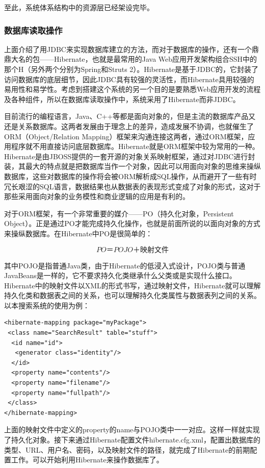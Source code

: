 \documentclass[12pt,a4paper]{article}
\begin{document}
	至此，系统体系结构中的资源层已经架设完毕。

		\subsubsection{数据库读取操作}
	上面介绍了用JDBC来实现数据库建立的方法，而对于数据库的操作，还有一个鼎鼎大名的包——Hibernate，也就是最常用的Java Web应用开发架构组合SSH中的那个H（另外两个分别为Spring和Struts 2）。Hibernate是基于JDBC的，它封装了访问数据库的底层细节，因此JDBC具有较强的灵活性，而Hibernate具用较强的易用性和易学性。考虑到搭建这个系统的另一个目的是要熟悉Web应用开发的流程及各种组件，所以在数据库读取操作中，系统采用了Hibernate而非JDBC。
	
	目前流行的编程语言，Java、C++等都是面向对象的，但是主流的数据库产品又还是关系数据库\cite{li2008}。这两者发展由于理念上的差异，造成发展不协调，也就催生了ORM（Object/Relation Mapping）框架来沟通连接这两者，通过ORM框架，应用程序就不用直接访问底层数据库。Hibernate就是ORM框架中较为常用的一种。Hibernate是由JBOSS提供的一套开源的对象关系映射框架，通过对JDBC进行封装，其最大的特点就是把数据库当作一个对象，因此可以用面向对象的思维来操纵数据库，这些对数据库的操作将会被ORM解析成SQL操作，从而避开了一些有时冗长艰涩的SQL语言，数据结果也从数据表的表现形式变成了对象的形式，这对于那些采用面向对象的业务模性和商业逻辑的应用是有利的。
	
	对于ORM框架，有一个非常重要的媒介——PO（持久化对象，Persistent Object）。正是通过PO才能完成持久化操作，也就是前面所说的以面向对象的方式来操纵数据库。在Hibernate中PO是很简单的：

	$$ PO ＝ POJO ＋ 映射文件 $$

	其中POJO是指普通Java类，由于Hibernate的低浸入式设计，POJO类与普通JavaBeans是一样的，它不要求持久化类继承什么父类或是实现什么接口。Hibernate中的映射文件以XML的形式书写，通过映射文件，Hibernate就可以理解持久化类和数据表之间的关系，也可以理解持久化类属性与数据表列之间的关系。以本搜索系统的使用为例：
	
\lstset{language=XML,frame=lines}
\begin{lstlisting}
<hibernate-mapping package="myPackage">
 <class name="SearchResult" table="stuff">
  <id name="id">
   <generator class="identity"/>
  </id>
  <property name="contents"/>
  <property name="filename"/>
  <property name="fullpath"/>
 </class>
</hibernate-mapping>
\end{lstlisting}	

	上面的映射文件中定义的property的name与POJO类中一一对应。这样一样就实现了持久化对象。接下来通过Hibernate配置文件hibernate.cfg.xml，配置出数据库的类型、URL、用户名、密码，以及映射文件的路径，就完成了Hibernate的前期配置工作。可以开始利用Hibernate来操作数据库了。
	
\end{document}
